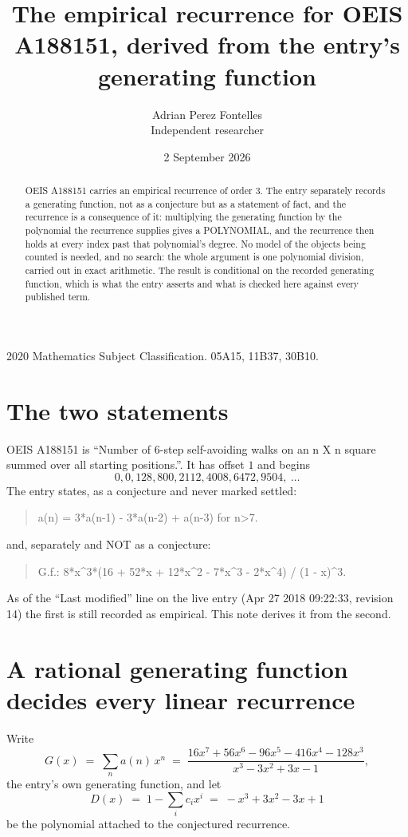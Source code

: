 \documentclass[11pt,a4paper]{article}
\title{The empirical recurrence for OEIS A188151, derived from the entry's generating function}
\author{Adrian Perez Fontelles\\ \small Independent researcher}
\date{2 September 2026}
\theoremstyle{plain}
\theoremstyle{definition}
\begin{document}
\maketitle

\begin{abstract}
OEIS A188151 carries an empirical recurrence of order $3$. The entry separately records a
generating function, not as a conjecture but as a statement of fact, and the recurrence is a
consequence of it: multiplying the generating function by the polynomial the recurrence
supplies gives a POLYNOMIAL, and the recurrence then holds at every index past that
polynomial's degree. No model of the objects being counted is needed, and no search: the
whole argument is one polynomial division, carried out in exact arithmetic. The result is
conditional on the recorded generating function, which is what the entry asserts and what is
checked here against every published term.
\end{abstract}

\noindent\small 2020 Mathematics Subject Classification. 05A15, 11B37, 30B10.\normalsize

\section{The two statements}

OEIS A188151 is ``Number of 6-step self-avoiding walks on an n X n square summed over all starting positions.''. It has offset $1$ and begins
\[
0, 0, 128, 800, 2112, 4008, 6472, 9504,\ \dots
\]
The entry states, as a conjecture and never marked settled:
\begin{quote}
a(n) = 3*a(n-1) - 3*a(n-2) + a(n-3) for n>7.
\end{quote}
and, separately and NOT as a conjecture:
\begin{quote}
G.f.: 8*x\^{}3*(16 + 52*x + 12*x\^{}2 - 7*x\^{}3 - 2*x\^{}4) / (1 - x)\^{}3.
\end{quote}
As of the ``Last modified'' line on the live entry (Apr 27 2018 09:22:33, revision 14) the first is still
recorded as empirical. This note derives it from the second.

\section{A rational generating function decides every linear recurrence}

Write
\[
G(x)\;=\;\sum_{n}a(n)\,x^{n}\;=\;\frac{16 x^{7} + 56 x^{6} - 96 x^{5} - 416 x^{4} - 128 x^{3}}{x^{3} - 3 x^{2} + 3 x - 1},
\]
the entry's own generating function, and let
\[
D(x)\;=\;1-\sum_i c_i x^{i}\;=\;- x^{3} + 3 x^{2} - 3 x + 1
\]
be the polynomial attached to the conjectured recurrence.
\end{document}
